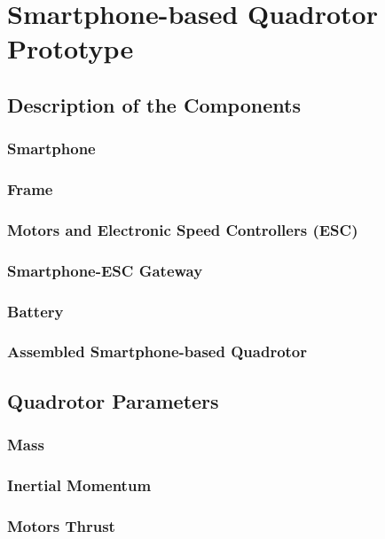 \chapter{Smartphone-based Quadrotor Prototype} \label{ch:prototype}

\section{Description of the Components}
\subsection{Smartphone}
\subsection{Frame}
\subsection{Motors and Electronic Speed Controllers (ESC)}
\subsection{Smartphone-ESC Gateway}
\subsection{Battery}
\subsection{Assembled Smartphone-based Quadrotor}

\section{Quadrotor Parameters}
\subsection{Mass}
\subsection{Inertial Momentum}
\subsection{Motors Thrust}

